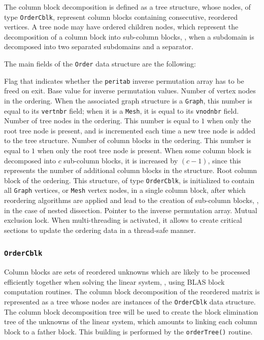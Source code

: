 The column block decomposition is defined as a tree structure, whose
nodes, of type \texttt{Order\lbt Cblk}, represent column blocks
containing consecutive, reordered vertices. A tree node may have
ordered children nodes, which represent the decomposition of a column
block into sub-column blocks, \eg, when a subdomain is decomposed into
two separated subdomains and a separator.

The main fields of the \texttt{Order} data structure are the
following:
\begin{itemize}
Flag that indicates whether the \texttt{peritab} inverse permutation
array has to be freed on exit.
Base value for inverse permutation values.
Number of vertex nodes in the ordering. When the associated graph
structure is a \texttt{Graph}, this number is equal to its
\texttt{vertnbr} field; when it is a \texttt{Mesh}, it is equal to
its \texttt{vnodnbr} field.
Number of tree nodes in the ordering. This number is equal to $1$ when
only the root tree node is present, and is incremented each time a new
tree node is added to the tree structure.
Number of column blocks in the ordering. This number is equal to $1$
when only the root tree node is present. When some column block
is decomposed into $c$ sub-column blocks, it is increased by $(c-1)$,
since this represents the number of additional column blocks in the
structure.
Root column block of the ordering. This structure, of type
\texttt{Order\lbt Cblk}, is initialized to contain all \texttt{Graph}
vertices, or \texttt{Mesh} vertex nodes, in a single column block,
after which reordering algorithms are applied and lead to the creation
of sub-column blocks, \eg, in the case of nested dissection.
Pointer to the inverse permutation array.
Mutual exclusion lock. When multi-threading is activated, it allows to
create critical sections to update the ordering data in a thread-safe
manner.
\end{itemize}

\subsubsection{\texttt{OrderCblk}}
\label{sec-data-order-cblk}

Column blocks are sets of reordered unknowns which are likely to be
processed efficiently together when solving the linear system, \eg,
using BLAS block computation routines. The column block decomposition
of the reordered matrix is represented as a tree whose nodes are
instances of the \texttt{OrderCblk} data structure. The column block
decomposition tree will be used to create the block elimination tree
of the unknowns of the linear system, which amounts to linking each
column block to a father block. This building is performed by the
\texttt{order\lbt Tree()} routine.

